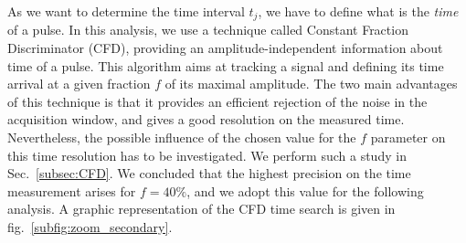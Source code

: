 As we want to determine the time interval $t_{j}$, we have to define what is the \emph{time} of a pulse.
In this analysis, we use a technique called Constant Fraction Discriminator (CFD), providing an amplitude-independent information about time of a pulse.
This algorithm aims at tracking a signal and defining its time arrival at a given fraction $f$ of its maximal amplitude.
The two main advantages of this technique is that it provides an efficient rejection of the noise in the acquisition window, and gives a good resolution on the measured time.
Nevertheless, the possible influence of the chosen value for the $f$ parameter on this time resolution has to be investigated.
We perform such a study in Sec.~\ref{subsec:CFD}.
We concluded that the highest precision on the time measurement arises for $f = 40\%$, and we adopt this value for the following analysis.
A graphic representation of the CFD time search is given in fig.~\ref{subfig:zoom_secondary}.
